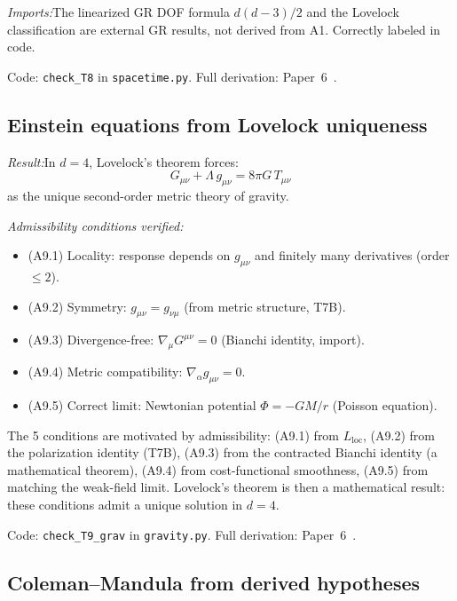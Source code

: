 \documentclass[11pt]{article}
\newcommand{\Lloc}{L_{\mathrm{loc}}}
\begin{document}
\textit{Imports:}\quad The linearized GR DOF formula $d(d-3)/2$ and the Lovelock classification are external GR results, not derived from A1.  Correctly labeled in code.

Code: \texttt{check\_T8} in \texttt{spacetime.py}.  Full derivation: Paper~6~\cite{P6}.


\subsection{Einstein equations from Lovelock uniqueness}

\begin{tcolorbox}[apfbox, title={T9\_grav: Einstein Equations from Five Admissibility Conditions}]
\textit{Result:}\quad In $d = 4$, Lovelock's theorem forces:
\begin{equation}
G_{\mu\nu} + \Lambda\, g_{\mu\nu} = 8\pi G\, T_{\mu\nu}
\end{equation}
as the unique second-order metric theory of gravity.

\smallskip\noindent\textit{Admissibility conditions verified:}
\begin{itemize}[nosep,leftmargin=2em]
\item (A9.1) Locality: response depends on $g_{\mu\nu}$ and finitely many derivatives (order $\le 2$).
\item (A9.2) Symmetry: $g_{\mu\nu} = g_{\nu\mu}$ (from metric structure, T7B).
\item (A9.3) Divergence-free: $\nabla_\mu G^{\mu\nu} = 0$ (Bianchi identity, import).
\item (A9.4) Metric compatibility: $\nabla_\alpha g_{\mu\nu} = 0$.
\item (A9.5) Correct limit: Newtonian potential $\Phi = -GM/r$ (Poisson equation).
\end{itemize}
\end{tcolorbox}

The 5 conditions are motivated by admissibility: (A9.1) from $\Lloc$, (A9.2) from the polarization identity (T7B), (A9.3) from the contracted Bianchi identity (a mathematical theorem), (A9.4) from cost-functional smoothness, (A9.5) from matching the weak-field limit.  Lovelock's theorem is then a mathematical result: these conditions admit a unique solution in $d = 4$.

Code: \texttt{check\_T9\_grav} in \texttt{gravity.py}.  Full derivation: Paper~6~\cite{P6}.


\subsection{Coleman--Mandula from derived hypotheses}
\end{document}
